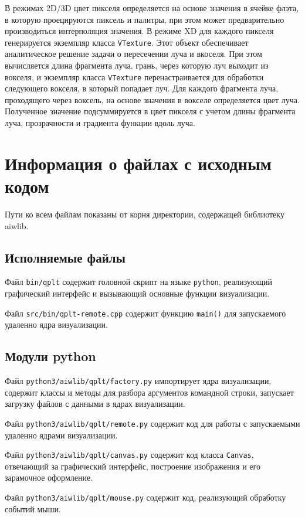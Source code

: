 \documentclass[12pt]{article}
\begin{document}
\begin{enumrate}
В режимах 2D/3D цвет пикселя определяется на основе значения в ячейке флэта, в которую проецируются пиксель и палитры,
при этом может предварительно производиться интерполяция значения. В режиме XD для каждого пикселя генерируется экземпляр
класса \verb'VTexture'. Этот объект обеспечивает аналитическое решение задачи о пересечении луча и вкоселя. При этом вычисляется длина фрагмента луча,
грань, через которую луч выходит из вокселя, и экземпляр класса \verb'VTexture' перенастраивается для обработки следующего вокселя, в который попадает луч.
Для каждого фрагмента луча, проходящего через воксель, на основе значения в вокселе определяется цвет луча. Полученное значение подсуммируется 
в цвет пикселя с учетом длины фрагмента луча, прозрачности и градиента функции вдоль луча. 


\section{Информация о файлах с исходным кодом}   %
Пути ко всем файлам показаны от корня директории, содержащей библиотеку aiwlib.
\subsection{Исполняемые файлы}
Файл \verb'bin/qplt' содержит головной скрипт на языке \verb'python', реализующий графический интерфейс и вызывающий основные функции визуализации.

Файл \verb'src/bin/qplt-remote.cpp' содержит функцию \verb'main()' для запускаемого удаленно ядра визуализации.

\subsection{Модули python}
Файл \verb'python3/aiwlib/qplt/factory.py' импортирует ядра визуализации, содержит классы и методы для разбора аргументов командной строки,
запускает загрузку файлов с данными в ядрах визуализации.

Файл \verb'python3/aiwlib/qplt/remote.py' содержит код для работы с запускаемыми удаленно ядрами визуализации.

Файл \verb'python3/aiwlib/qplt/canvas.py' содержит код класса \verb'Canvas', отвечающий за графический интерфейс, построение изображения и его
зарамочное оформление.

Файл \verb'python3/aiwlib/qplt/mouse.py' содержит код, реализующий обработку событий мыши.


\end{enumrate}
\end{document}
